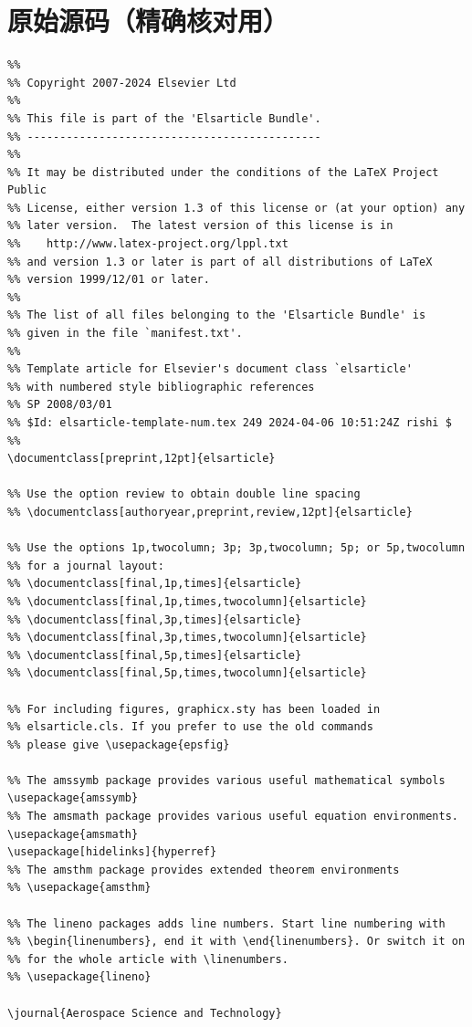 \documentclass[12pt]{article}
\begin{document}
\section*{原始源码（精确核对用）}
\begin{verbatim}
%%
%% Copyright 2007-2024 Elsevier Ltd
%%
%% This file is part of the 'Elsarticle Bundle'.
%% ---------------------------------------------
%%
%% It may be distributed under the conditions of the LaTeX Project Public
%% License, either version 1.3 of this license or (at your option) any
%% later version.  The latest version of this license is in
%%    http://www.latex-project.org/lppl.txt
%% and version 1.3 or later is part of all distributions of LaTeX
%% version 1999/12/01 or later.
%%
%% The list of all files belonging to the 'Elsarticle Bundle' is
%% given in the file `manifest.txt'.
%%
%% Template article for Elsevier's document class `elsarticle'
%% with numbered style bibliographic references
%% SP 2008/03/01
%% $Id: elsarticle-template-num.tex 249 2024-04-06 10:51:24Z rishi $
%%
\documentclass[preprint,12pt]{elsarticle}

%% Use the option review to obtain double line spacing
%% \documentclass[authoryear,preprint,review,12pt]{elsarticle}

%% Use the options 1p,twocolumn; 3p; 3p,twocolumn; 5p; or 5p,twocolumn
%% for a journal layout:
%% \documentclass[final,1p,times]{elsarticle}
%% \documentclass[final,1p,times,twocolumn]{elsarticle}
%% \documentclass[final,3p,times]{elsarticle}
%% \documentclass[final,3p,times,twocolumn]{elsarticle}
%% \documentclass[final,5p,times]{elsarticle}
%% \documentclass[final,5p,times,twocolumn]{elsarticle}

%% For including figures, graphicx.sty has been loaded in
%% elsarticle.cls. If you prefer to use the old commands
%% please give \usepackage{epsfig}

%% The amssymb package provides various useful mathematical symbols
\usepackage{amssymb}
%% The amsmath package provides various useful equation environments.
\usepackage{amsmath}
\usepackage[hidelinks]{hyperref}
%% The amsthm package provides extended theorem environments
%% \usepackage{amsthm}

%% The lineno packages adds line numbers. Start line numbering with
%% \begin{linenumbers}, end it with \end{linenumbers}. Or switch it on
%% for the whole article with \linenumbers.
%% \usepackage{lineno}

\journal{Aerospace Science and Technology}


\end{verbatim}
\end{document}
